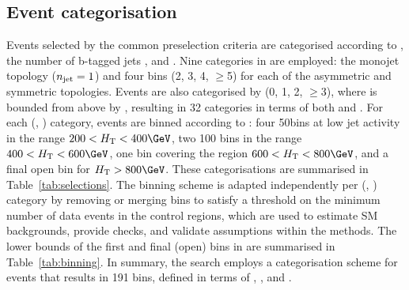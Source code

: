 \subsection{Event categorisation}
\label{sec:categorisation}

Events selected by the common preselection criteria are categorised
according to \njet, the number of b-tagged jets \nb, and \scalht. Nine
categories in \njet are employed: the monojet topology ($n_{\text{jet}} = 1$)
and four \njet bins (2, 3, 4, $\geq$5) for each of the asymmetric and
symmetric topologies. Events are also categorised by \nb (0, 1, 2,
$\geq$3), where \nb is bounded from above by \njet, resulting in 32
categories in terms of both \njet and \nb. For each (\njet, \nb)
category, events are binned according to \scalht: four 50\GeV bins at
low jet activity in the range $200 < \scalht < 400\GeV$, two 100\GeV
bins in the range $400 < \scalht < 600\GeV$, one bin covering the
region $600 < \scalht < 800\GeV$, and a final open bin for $\scalht >
800\GeV$. These categorisations are summarised in
Table~\ref{tab:selections}. The \scalht binning scheme is adapted
independently per (\njet, \nb) category by removing or merging bins to
satisfy a threshold on the minimum number of data events in the
control regions, which are used to estimate SM backgrounds, provide
checks, and validate assumptions within the methods. The lower bounds
of the first and final (open) bins in \scalht are summarised in
Table~\ref{tab:binning}. In summary, the search employs a
categorisation scheme for events that results in 191 bins, defined in
terms of \njet, \nb, and \scalht.

